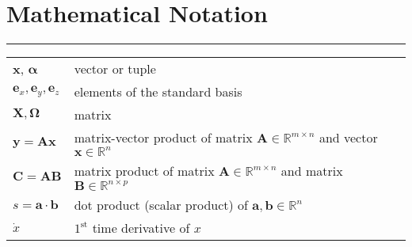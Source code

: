 \section{Mathematical Notation}

\begin{table*}[!h]
  \scriptsize
  \centering
  \noindent\rule{\textwidth}{0.5pt}
  \begin{tabular}{lll}


    $\mathbf{x}$, $\bm{\alpha}$ & vector or tuple\\
    $\mathbf{e}_x, \mathbf{e}_y, \mathbf{e}_z$ & elements of the standard basis \\
    $\mathbf{X}, \bm{\Omega}$ & matrix \\
    $\mathbf{y} = \mathbf{A}\mathbf{x}$ & matrix-vector product of matrix $\mathbf{A} \in \mathbb{R}^{m \times n}$ and vector $\mathbf{x} \in \mathbb{R}^n$ \\
    $\mathbf{C} = \mathbf{A}\mathbf{B}$ & matrix product of matrix $\mathbf{A} \in \mathbb{R}^{m \times n}$ and matrix $\mathbf{B} \in \mathbb{R}^{n \times p}$ \\
    $s = \mathbf{a} \cdot \mathbf{b}$ & dot product (scalar product) of $\mathbf{a}, \mathbf{b} \in \mathbb{R}^n$ \\
    $\dot{x}$ & ${1^{\mathrm{st}}}$ time derivative of $x$\\

\end{tabular}
\end{table*}
